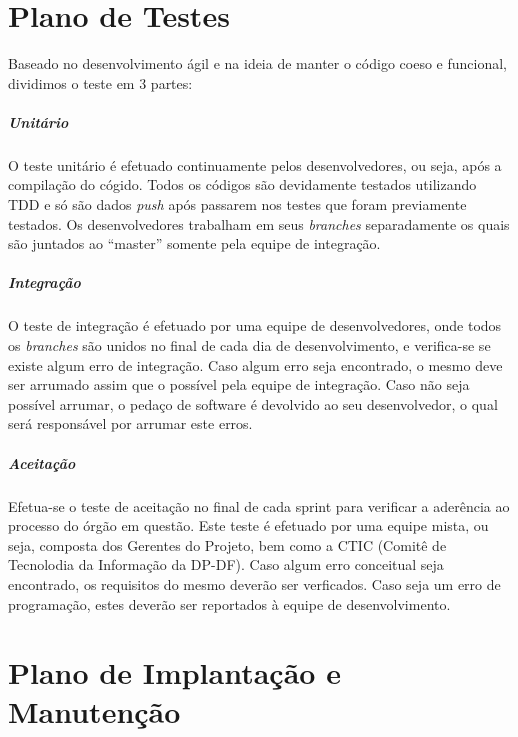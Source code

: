 \documentclass[12pt,a4paper]{report}
\begin{document}

\chapter{Plano de Testes}
Baseado no desenvolvimento ágil e na ideia de manter o código coeso e funcional, dividimos o teste em 3 partes:

\paragraph{Unitário} O teste unitário é efetuado continuamente pelos desenvolvedores, ou seja, após a compilação do cógido. Todos os códigos são devidamente testados utilizando TDD e só são dados \textit{push} após passarem nos testes que foram previamente testados. Os desenvolvedores trabalham em seus \textit{branches} separadamente os quais são juntados ao ``master'' somente pela equipe de integração.

\paragraph{Integração} O teste de integração é efetuado por uma equipe de desenvolvedores, onde todos os \textit{branches} são unidos no final de cada dia de desenvolvimento, e verifica-se se existe algum erro de integração. Caso algum erro seja encontrado, o mesmo deve ser arrumado assim que o possível pela equipe de integração. Caso não seja possível arrumar, o pedaço de software é devolvido ao seu desenvolvedor, o qual será responsável por arrumar este erros.

\paragraph{Aceitação} Efetua-se o teste de aceitação no final de cada sprint para verificar a aderência ao processo do órgão em questão. Este teste é efetuado por uma equipe mista, ou seja, composta dos Gerentes do Projeto, bem como a CTIC (Comitê de Tecnolodia da Informação da DP-DF). Caso algum erro conceitual seja encontrado, os requisitos do mesmo deverão ser verficados. Caso seja um erro de programação, estes deverão ser reportados à equipe de desenvolvimento.

\chapter{Plano de Implantação e Manutenção}
\end{document}
